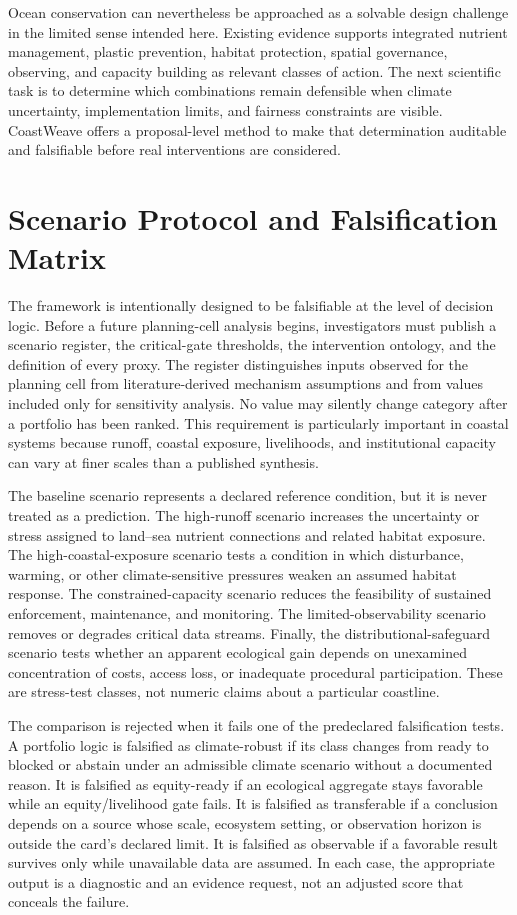 \documentclass[conference]{IEEEtran}
\newcommand{\coast}{CoastWeave}
\begin{document}
Ocean conservation can nevertheless be approached as a solvable design challenge in the limited sense intended here. Existing evidence supports integrated nutrient management, plastic prevention, habitat protection, spatial governance, observing, and capacity building as relevant classes of action. The next scientific task is to determine which combinations remain defensible when climate uncertainty, implementation limits, and fairness constraints are visible. \coast{} offers a proposal-level method to make that determination auditable and falsifiable before real interventions are considered.

\appendices
\section{Scenario Protocol and Falsification Matrix}

The framework is intentionally designed to be falsifiable at the level of decision logic. Before a future planning-cell analysis begins, investigators must publish a scenario register, the critical-gate thresholds, the intervention ontology, and the definition of every proxy. The register distinguishes inputs observed for the planning cell from literature-derived mechanism assumptions and from values included only for sensitivity analysis. No value may silently change category after a portfolio has been ranked. This requirement is particularly important in coastal systems because runoff, coastal exposure, livelihoods, and institutional capacity can vary at finer scales than a published synthesis.

The baseline scenario represents a declared reference condition, but it is never treated as a prediction. The high-runoff scenario increases the uncertainty or stress assigned to land--sea nutrient connections and related habitat exposure. The high-coastal-exposure scenario tests a condition in which disturbance, warming, or other climate-sensitive pressures weaken an assumed habitat response. The constrained-capacity scenario reduces the feasibility of sustained enforcement, maintenance, and monitoring. The limited-observability scenario removes or degrades critical data streams. Finally, the distributional-safeguard scenario tests whether an apparent ecological gain depends on unexamined concentration of costs, access loss, or inadequate procedural participation. These are stress-test classes, not numeric claims about a particular coastline.

The comparison is rejected when it fails one of the predeclared falsification tests. A portfolio logic is falsified as climate-robust if its class changes from ready to blocked or abstain under an admissible climate scenario without a documented reason. It is falsified as equity-ready if an ecological aggregate stays favorable while an equity/livelihood gate fails. It is falsified as transferable if a conclusion depends on a source whose scale, ecosystem setting, or observation horizon is outside the card's declared limit. It is falsified as observable if a favorable result survives only while unavailable data are assumed. In each case, the appropriate output is a diagnostic and an evidence request, not an adjusted score that conceals the failure.
\end{document}
